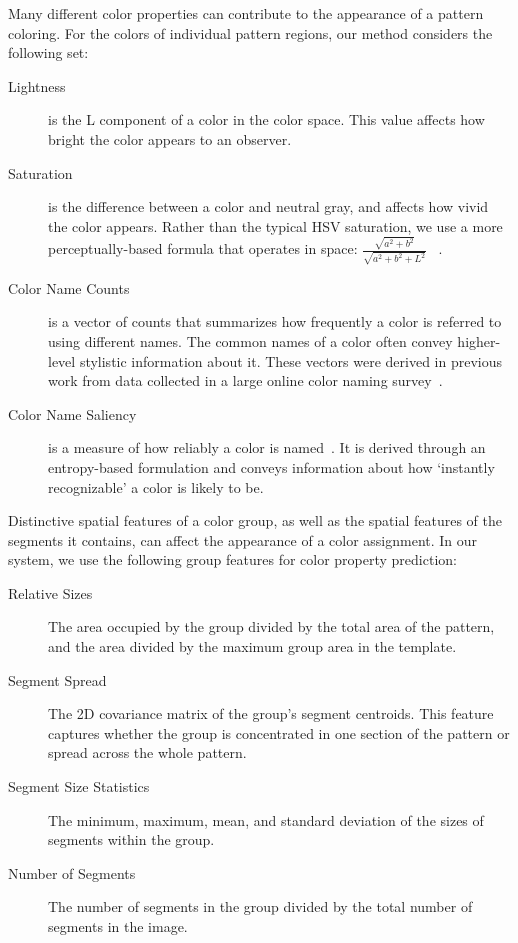 Many different color properties can contribute to the appearance of a pattern coloring. For the colors of individual pattern regions, our method considers the following set:
\begin{description}
	\item[Lightness] is the L component of a color in the \lab color space. This value affects how bright the color appears to an observer.
	\item[Saturation] is the difference between a color and neutral gray, and affects how vivid the color appears. Rather than the typical HSV saturation, we use a more perceptually-based formula that operates in \lab space: $\frac{\sqrt{a^2+b^2}}{\sqrt{a^2+b^2+L^2}}$ ~\cite{ColorfulnessReference}.
	\item[Color Name Counts] is a vector of counts that summarizes how frequently a color is referred to using different names. The common names of a color often convey higher-level stylistic information about it. These vectors were derived in previous work from data collected in a large online color naming survey~\cite{ColorNamingModels}.
	\item[Color Name Saliency] is a measure of how reliably a color is named~\cite{ColorNamingModels}. It is derived through an entropy-based formulation and conveys information about how `instantly recognizable' a color is likely to be.
\end{description}
%
%
Distinctive spatial features of a color group, as well as the spatial features of the segments it contains, can affect the appearance of a color assignment. In our system, we use the following group features for color property prediction:
\begin{description}
	\item[Relative Sizes] The area occupied by the group divided by the total area of the pattern, and the area divided by the maximum group area in the template.
  \item[Segment Spread] The 2D covariance matrix of the group's segment centroids. This feature captures whether the group is concentrated in one section of the pattern or spread across the whole pattern.
  \item[Segment Size Statistics] The minimum, maximum, mean, and standard deviation of the sizes of segments within the group.
  \item[Number of Segments] The number of segments in the group divided by the total number of segments in the image.
\end{description}
